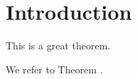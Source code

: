 \chapter{Introduction}


\begin{theorem}[theoremname][Test]
  This is a great theorem.
\end{theorem}

We refer to Theorem .



